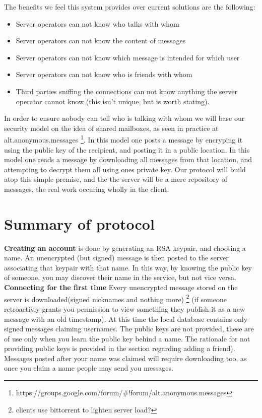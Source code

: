 The benefits we feel this system provides over current solutions are the
following:
\begin{itemize}
\item Server operators can not know who talks with whom
\item Server operators can not know the content of messages
\item Server operators can not know which message is intended for which user
\item Server operators can not know who is friends with whom
\item Third parties sniffing the connections can not know anything the server
operator cannot know (this isn't unique, but is worth stating).
\end{itemize}

In order to ensure nobody can tell who is talking with whom we will base our
security model on the idea of shared mailboxes, as seen in practice at
alt.anonymous.messages
\footnote{https://groups.google.com/forum/\#!forum/alt.anonymous.messages}.
In this model one posts a message by encryping it using the public key of the
recipient, and posting it in a public location. In this model one reads a
message by downloading all messages from that location, and attempting to
decrypt them all using ones private key. Our protocol will build atop this
simple premise, and the the server will be a mere repository of messages, the
real work occuring wholly in the client.

\section{Summary of protocol} 
\textbf{Creating an account} is done by generating an RSA keypair, and choosing
a name. An unencrypted (but signed) message is then posted to the server
associating that keypair with that name. In this way, by knowing the public key
of someone, you may discover their name in the service, but not vice versa.\\

\textbf{Connecting for the first time} Every unencrypted message stored on the
server is downloaded(signed nicknames and nothing more) \footnote{clients use
bittorrent to lighten server load?} (if someone retroactivly grants you
permission to view something they publish it as a new message with an old
timestamp). At this time the local database contains only signed messages
claiming usernames. The public keys are not provided, these are of use only when
you learn the public key behind a name. The rationale for not providing public
keys is provided in the section regarding adding a friend). Messages posted
after your name was claimed will require downloading too, as once you claim a
name people may send you messages.\\

